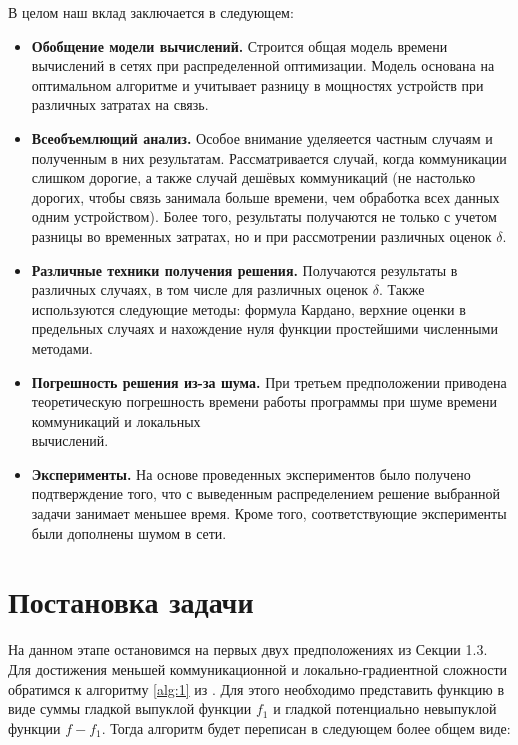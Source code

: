 \documentclass{article}
\theoremstyle{definition}
\theoremstyle{plain}
\begin{document}
В целом наш вклад заключается в следующем:
\begin{itemize}
    \item \textbf{Обобщение модели вычислений.} Строится общая модель времени вычислений в сетях при распределенной оптимизации. Модель основана на оптимальном алгоритме \cite{kovalev2022optimal} и учитывает разницу в мощностях устройств при различных затратах на связь.
    \item \textbf{Всеобъемлющий анализ.} Особое внимание уделяеется частным случаям и полученным в них результатам. Рассматривается случай, когда коммуникации слишком дорогие, а также случай дешёвых коммуникаций (не настолько дорогих, чтобы связь занимала больше времени, чем обработка всех данных одним устройством). Более того, результаты получаются не только с учетом разницы во временных затратах, но и при рассмотрении различных оценок $\delta$.
    \item \textbf{Различные техники получения решения.} Получаются результаты в различных случаях, в том числе для различных оценок $\delta$. Также используются следующие методы: формула Кардано, верхние оценки в предельных случаях и нахождение нуля функции простейшими численными методами.
    \item \textbf{Погрешность решения из-за шума.} При третьем предположении приводена теоретическую погрешность времени работы программы при шуме времени коммуникаций и локальных\\ вычислений.
    \item \textbf{Эксперименты.} На основе проведенных экспериментов было получено подтверждение того, что с выведенным распределением решение выбранной задачи занимает меньшее время. Кроме того, соответствующие эксперименты были дополнены шумом в сети.
\end{itemize}

\section{Постановка задачи}

На данном этапе остановимся на первых двух предположениях из Секции 1.3. Для достижения меньшей коммуникационной и локально-градиентной сложности обратимся к алгоритму \ref{alg:1} из \cite{kovalev2022optimal}. Для этого необходимо представить функцию в виде суммы гладкой выпуклой функции $f_1$ и гладкой потенциально невыпуклой функции $f - f_1$. Тогда алгоритм будет переписан в следующем более общем виде:
\end{document}
